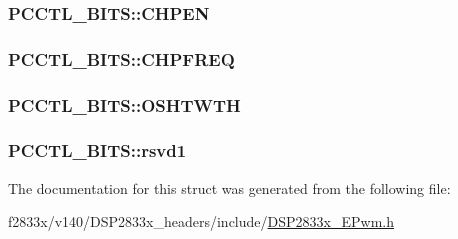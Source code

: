 \subsubsection[{C\+H\+P\+E\+N}]{ P\+C\+C\+T\+L\+\_\+\+B\+I\+T\+S\+::\+C\+H\+P\+E\+N}\label{struct_p_c_c_t_l___b_i_t_s_a0b4bc7768b79be8f8af5bd9af3bf050a}
\hypertarget{struct_p_c_c_t_l___b_i_t_s_a8bdfb308ef78915633cfb18cd76ed153}{}
\subsubsection[{C\+H\+P\+F\+R\+E\+Q}]{ P\+C\+C\+T\+L\+\_\+\+B\+I\+T\+S\+::\+C\+H\+P\+F\+R\+E\+Q}\label{struct_p_c_c_t_l___b_i_t_s_a8bdfb308ef78915633cfb18cd76ed153}
\hypertarget{struct_p_c_c_t_l___b_i_t_s_ae278a0bc2c79ef54ecbc29fca4518851}{}
\subsubsection[{O\+S\+H\+T\+W\+T\+H}]{ P\+C\+C\+T\+L\+\_\+\+B\+I\+T\+S\+::\+O\+S\+H\+T\+W\+T\+H}\label{struct_p_c_c_t_l___b_i_t_s_ae278a0bc2c79ef54ecbc29fca4518851}
\hypertarget{struct_p_c_c_t_l___b_i_t_s_a7ea0e817ae5dd68a7d1f1ce0085618d3}{}
\subsubsection[{rsvd1}]{ P\+C\+C\+T\+L\+\_\+\+B\+I\+T\+S\+::rsvd1}\label{struct_p_c_c_t_l___b_i_t_s_a7ea0e817ae5dd68a7d1f1ce0085618d3}


The documentation for this struct was generated from the following file\+:\begin{DoxyCompactItemize}
\item 
f2833x/v140/\+D\+S\+P2833x\+\_\+headers/include/\hyperlink{_d_s_p2833x___e_pwm_8h}{D\+S\+P2833x\+\_\+\+E\+Pwm.\+h}\end{DoxyCompactItemize}
